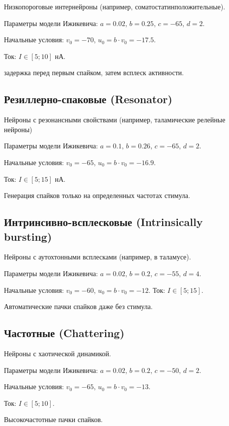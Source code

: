 Низкопороговые интернейроны (например, соматостатинположительные).

Параметры модели Ижикевича: $a=0.02$, $b=0.25$, $c = -65$, $d = 2$.

Начальные условия: $v_0 = -70$, $u_0 = b \cdot v_0 = -17.5$. 

Ток: $I \in [5; 10]$ нА.

задержка перед первым спайком, затем всплеск активности.


\subsection{Резиллерно-спаковые (Resonator)}

Нейроны с резонансными свойствами (например, таламические релейные нейроны)

Параметры модели Ижикевича: $a=0.1$, $b=0.26$, $c = -65$, $d = 2$.

Начальные условия: $v_0 = -65$, $u_0 = b \cdot v_0 = -16.9$. 

Ток: $I \in [5; 15]$ нА.

Генерация спайков только на определенных частотах стимула.


\subsection{Интринсивно-всплесковые (Intrinsically bursting)}
Нейроны с аутохтонными всплесками (например, в таламусе).

Параметры модели Ижикевича: $a=0.02$, $b=0.2$, $c = -55$, $d = 4$.

Начальные условия: $v_0 = -60$, $u_0 = b \cdot v_0 = -12$. 
Ток: $I \in [5; 15]$.


Автоматические пачки спайков даже без стимула.


\subsection{Частотные (Chattering)}
Нейроны с хаотической динамикой.

Параметры модели Ижикевича: $a=0.02$, $b=0.2$, $c = -50$, $d = 2$.

Начальные условия: $v_0 = -65$, $u_0 = b \cdot v_0 = -13$. 

Ток: $I \in [5; 10]$.

Высокочастотные пачки спайков.



\endinput